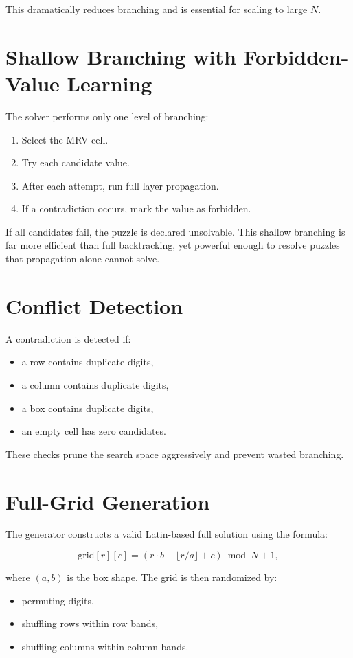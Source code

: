 \documentclass[11pt]{article}
\begin{document}
This dramatically reduces branching and is essential for scaling to large $N$.

\section{Shallow Branching with Forbidden-Value Learning}
The solver performs only one level of branching:
\begin{enumerate}
    \item Select the MRV cell.
    \item Try each candidate value.
    \item After each attempt, run full layer propagation.
    \item If a contradiction occurs, mark the value as forbidden.
\end{enumerate}

If all candidates fail, the puzzle is declared unsolvable.
This shallow branching is far more efficient than full backtracking, yet powerful
enough to resolve puzzles that propagation alone cannot solve.

\section{Conflict Detection}
A contradiction is detected if:
\begin{itemize}
    \item a row contains duplicate digits,
    \item a column contains duplicate digits,
    \item a box contains duplicate digits,
    \item an empty cell has zero candidates.
\end{itemize}
These checks prune the search space aggressively and prevent wasted branching.

\section{Full-Grid Generation}
The generator constructs a valid Latin-based full solution using the formula:


\[
\text{grid}[r][c] = (r \cdot b + \lfloor r/a \rfloor + c) \bmod N + 1,
\]


where $(a,b)$ is the box shape. The grid is then randomized by:
\begin{itemize}
    \item permuting digits,
    \item shuffling rows within row bands,
    \item shuffling columns within column bands.
\end{itemize}
\end{document}

